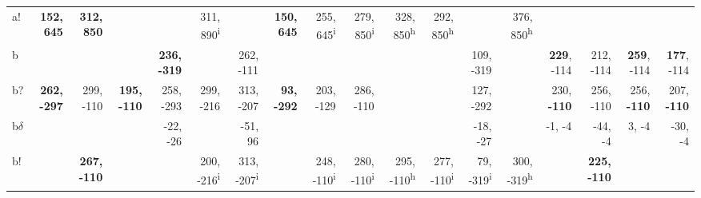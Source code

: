\begin{table}[p]
{\begin{tabular}{lrrrrrrrrrrrrrrrrr}
a! & \textbf{152, 645} & \textbf{312, 850} &  &  & 311, 890\textsuperscript{i} &  & \textbf{150, 645} & 255, 645\textsuperscript{i} & 279, 850\textsuperscript{i} & 328, 850\textsuperscript{h} & 292, 850\textsuperscript{h} &  & 376, 850\textsuperscript{h} &  &  &  &  \\
b &  &  &  & \textbf{236, -319} &  & 262, -111 &  &  &  &  &  & 109, -319 &  & \textbf{229}, -114 & 212, -114 & \textbf{259}, -114 & \textbf{177}, -114 \\
b? & \textbf{262, -297} & 299, -110 & \textbf{195, -110} & 258, -293 & 299, -216 & 313, -207 & \textbf{93, -292} & 203, -129 & 286, -110 &  &  & 127, -292 &  & 230, \textbf{-110} & 256, -110 & 256, \textbf{-110} & 207, \textbf{-110} \\
b$\delta$ &  &  &  & -22, -26 &  & -51, 96 &  &  &  &  &  & -18, -27 &  & -1, -4 & -44, -4 & 3, -4 & -30, -4 \\
b! &  & \textbf{267, -110} &  &  & 200, -216\textsuperscript{i} & 313, -207\textsuperscript{i} &  & 248, -110\textsuperscript{i} & 280, -110\textsuperscript{i} & 295, -110\textsuperscript{h} & 277, -110\textsuperscript{i} & 79, -319\textsuperscript{i} & 300, -319\textsuperscript{h} &  & \textbf{225, -110} &  &  \\

\end{tabular}
}
\end{table}
\clearpage


